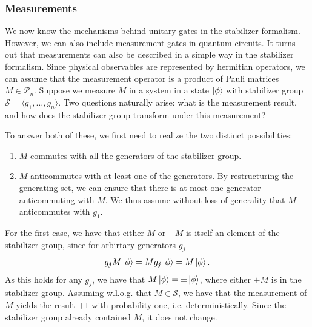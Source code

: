 \subsubsection{Measurements}

We now know the mechanisms behind unitary gates in the stabilizer formalism.
However, we can also include measurement gates in quantum circuits. It turns
out that measurements can also be described in a simple way in the stabilizer
formalism. Since physical observables are represented by hermitian operators,
we can assume that the measurement operator is a product of Pauli matrices $M
\in\mathcal{P}_n$. Suppose we measure $M$ in a system in a state $\ket{\phi}$
with stabilizer group $\mathcal{S} = \langle g_1, \ldots, g_n\rangle$. Two
questions naturally arise: what is the measurement result, and how does the
stabilizer group transform under this measurement?

To answer both of these, we first need to realize the two distinct
possibilities:
\begin{enumerate}
  \item $M$ commutes with all the generators of the stabilizer group.
  \item $M$ anticommutes with at least one of the generators. By restructuring
    the generating set, we can ensure that there is at most one generator
    anticommuting with $M$. We thus assume without loss of generality that $M$
    anticommutes with $g_1$.
\end{enumerate}

For the first case, we have that either $M$ or $-M$ is itself an element of the
stabilizer group, since for arbirtary generators $g_j$
\begin{align}
  g_j M \ket{\phi} = M g_j \ket{\phi} = M\ket{\phi}
.\end{align}
As this holds for any $g_j$, we have that $M\ket{\phi}=\pm \ket{\phi}$, where
either $\pm M$ is in the stabilizer group. Assuming w.l.o.g. that
$M\in\mathcal{S}$, we have that the measurement of $M$ yields the result $+1$
with probability one, i.e. deterministically. Since the stabilizer group
already contained $M$, it does not change. 

